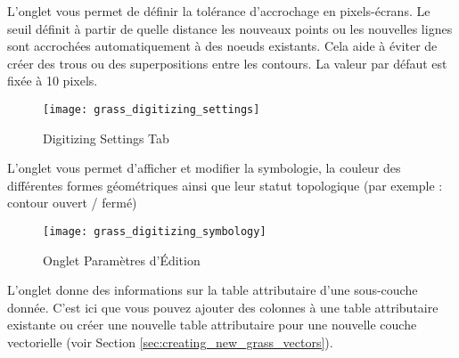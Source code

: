 {%
\label{label_settingtab}


L'onglet  vous permet de définir la tolérance d'accrochage en pixels-écrans. Le seuil définit à partir de quelle distance les nouveaux points ou les nouvelles lignes sont accrochées automatiquement à des noeuds existants. Cela aide à éviter de créer des trous ou des superpositions entre les contours. La valeur par défaut est fixée à 10 pixels.

\begin{figure}[ht]
 \begin{center}
 \texttt{[image: grass\_digitizing\_settings]}
 \caption{\grass Digitizing Settings Tab \nixcaption}\label{fig:grass_digitizing_settings}
 \end{center}
\end{figure}


L'onglet  vous permet d'afficher et modifier la symbologie, la couleur des différentes formes géométriques ainsi que leur statut topologique (par exemple : contour ouvert / fermé)

\begin{figure}[ht]
 \begin{center}
 \texttt{[image: grass\_digitizing\_symbology]}
  \caption{Onglet Paramètres d'Édition \grass \nixcaption}\label{fig:grass_digitizing_settingsTODO}
 \end{center}
\end{figure}

 
L'onglet  donne des informations sur la table attributaire d'une sous-couche donnée. C'est ici que vous pouvez ajouter des colonnes à une table attributaire existante ou créer une nouvelle table attributaire pour une nouvelle couche vectorielle \grass (voir Section \ref{sec:creating_new_grass_vectors}).

}
